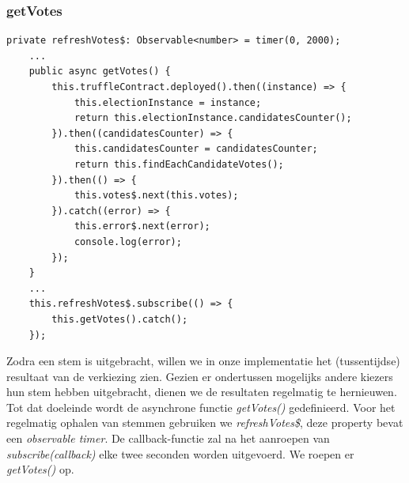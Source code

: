 	\subsubsection{getVotes}
	\lstset{language=JavaScriptSolidity} 
	\begin{lstlisting}[numbers=none]
	private refreshVotes$: Observable<number> = timer(0, 2000);
	...
	public async getVotes() {
		this.truffleContract.deployed().then((instance) => {
			this.electionInstance = instance;
			return this.electionInstance.candidatesCounter();
		}).then((candidatesCounter) => {
			this.candidatesCounter = candidatesCounter;
			return this.findEachCandidateVotes();
		}).then(() => {
			this.votes$.next(this.votes);
		}).catch((error) => {
			this.error$.next(error);
			console.log(error);
		});
	}
	...
	this.refreshVotes$.subscribe(() => {
		this.getVotes().catch();
	});
	\end{lstlisting}
	Zodra een stem is uitgebracht, willen we in onze implementatie het (tussentijdse) resultaat van de verkiezing zien. Gezien er ondertussen mogelijks andere kiezers hun stem hebben uitgebracht, dienen we de resultaten regelmatig te hernieuwen. Tot dat doeleinde wordt de asynchrone functie \textit{getVotes()} gedefinieerd. Voor het regelmatig ophalen van stemmen gebruiken we \textit{refreshVotes\$}, deze property bevat een \textit{observable timer}. De callback-functie zal na het aanroepen van \textit{subscribe(callback)} elke twee seconden worden uitgevoerd. We roepen er \textit{getVotes()} op.
